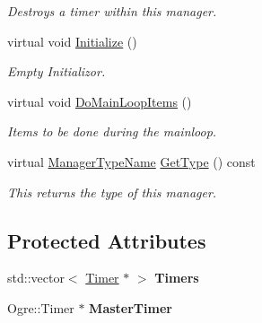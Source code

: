\begin{DoxyCompactItemize}
\begin{DoxyCompactList}\small\item\em Destroys a timer within this manager. \item\end{DoxyCompactList}\item 
virtual void \hyperlink{classphys_1_1TimerManager_ab6ee47352a406682178b4496544bcf6f}{Initialize} ()
\begin{DoxyCompactList}\small\item\em Empty Initializor. \item\end{DoxyCompactList}\item 
virtual void \hyperlink{classphys_1_1TimerManager_a98b7e74fe1e3eff7aee506477abe2a9c}{DoMainLoopItems} ()
\begin{DoxyCompactList}\small\item\em Items to be done during the mainloop. \item\end{DoxyCompactList}\item 
virtual \hyperlink{classphys_1_1ManagerBase_aaa6ccddf23892eaccb898529414f80a5}{ManagerTypeName} \hyperlink{classphys_1_1TimerManager_a716811f51cb9e97ed6e9db310f34e9dc}{GetType} () const 
\begin{DoxyCompactList}\small\item\em This returns the type of this manager. \item\end{DoxyCompactList}\end{DoxyCompactItemize}
\subsection*{Protected Attributes}
\begin{DoxyCompactItemize}
\item 
\hypertarget{classphys_1_1TimerManager_abaee576a7ee35350aac057c6970d0256}{
std::vector$<$ \hyperlink{classphys_1_1Timer}{Timer} $\ast$ $>$ {\bfseries Timers}}
\label{dc/d66/classphys_1_1TimerManager_abaee576a7ee35350aac057c6970d0256}

\item 
\hypertarget{classphys_1_1TimerManager_aa892d5ff53ecbe14f557baccdc16dc4f}{
Ogre::Timer $\ast$ {\bfseries MasterTimer}}
\label{dc/d66/classphys_1_1TimerManager_aa892d5ff53ecbe14f557baccdc16dc4f}

\end{DoxyCompactItemize}


